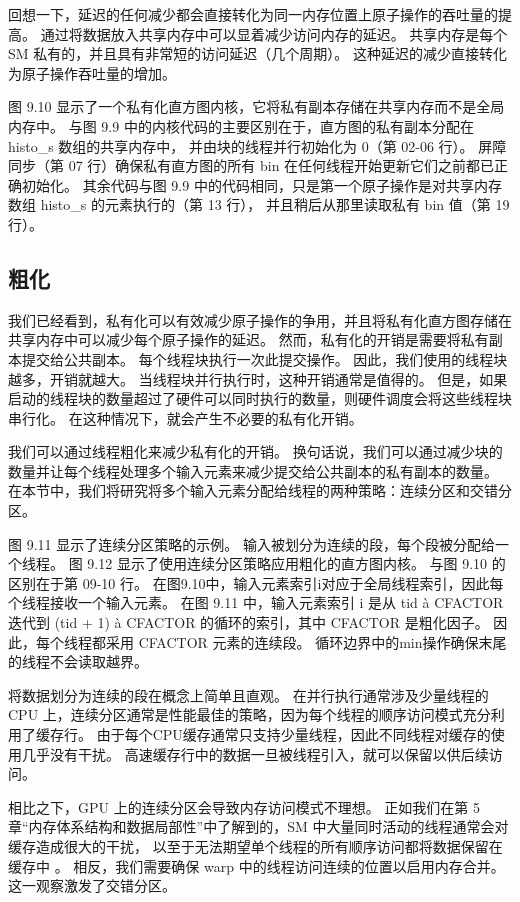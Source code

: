 回想一下，延迟的任何减少都会直接转化为同一内存位置上原子操作的吞吐量的提高。 
通过将数据放入共享内存中可以显着减少访问内存的延迟。 共享内存是每个 SM 私有的，并且具有非常短的访问延迟（几个周期）。 
这种延迟的减少直接转化为原子操作吞吐量的增加。

图 9.10 显示了一个私有化直方图内核，它将私有副本存储在共享内存而不是全局内存中。 
与图 9.9 中的内核代码的主要区别在于，直方图的私有副本分配在 histo\_s 数组的共享内存中，
并由块的线程并行初始化为 0（第 02-06 行）。 
屏障同步（第 07 行）确保私有直方图的所有 bin 在任何线程开始更新它们之前都已正确初始化。 
其余代码与图 9.9 中的代码相同，只是第一个原子操作是对共享内存数组 histo\_s 的元素执行的（第 13 行），
并且稍后从那里读取私有 bin 值（第 19 行）。

\subsection{粗化}
我们已经看到，私有化可以有效减少原子操作的争用，并且将私有化直方图存储在共享内存中可以减少每个原子操作的延迟。 
然而，私有化的开销是需要将私有副本提交给公共副本。 每个线程块执行一次此提交操作。 因此，我们使用的线程块越多，开销就越大。 
当线程块并行执行时，这种开销通常是值得的。 
但是，如果启动的线程块的数量超过了硬件可以同时执行的数量，则硬件调度会将这些线程块串行化。 
在这种情况下，就会产生不必要的私有化开销。

我们可以通过线程粗化来减少私有化的开销。 
换句话说，我们可以通过减少块的数量并让每个线程处理多个输入元素来减少提交给公共副本的私有副本的数量。 
在本节中，我们将研究将多个输入元素分配给线程的两种策略：连续分区和交错分区。

图 9.11 显示了连续分区策略的示例。 输入被划分为连续的段，每个段被分配给一个线程。 
图 9.12 显示了使用连续分区策略应用粗化的直方图内核。 与图 9.10 的区别在于第 09-10 行。 
在图9.10中，输入元素索引i对应于全局线程索引，因此每个线程接收一个输入元素。 
在图 9.11 中，输入元素索引 i 是从 tid à CFACTOR 迭代到 (tid + 1) à CFACTOR 的循环的索引，其中 CFACTOR 是粗化因子。 
因此，每个线程都采用 CFACTOR 元素的连续段。 循环边界中的min操作确保末尾的线程不会读取越界。

将数据划分为连续的段在概念上简单且直观。 
在并行执行通常涉及少量线程的 CPU 上，连续分区通常是性能最佳的策略，因为每个线程的顺序访问模式充分利用了缓存行。 
由于每个CPU缓存通常只支持少量线程，因此不同线程对缓存的使用几乎没有干扰。 
高速缓存行中的数据一旦被线程引入，就可以保留以供后续访问。

相比之下，GPU 上的连续分区会导致内存访问模式不理想。 
正如我们在第 5 章“内存体系结构和数据局部性”中了解到的，SM 中大量同时活动的线程通常会对缓存造成很大的干扰，
以至于无法期望单个线程的所有顺序访问都将数据保留在缓存中 。 
相反，我们需要确保 warp 中的线程访问连续的位置以启用内存合并。 这一观察激发了交错分区。

